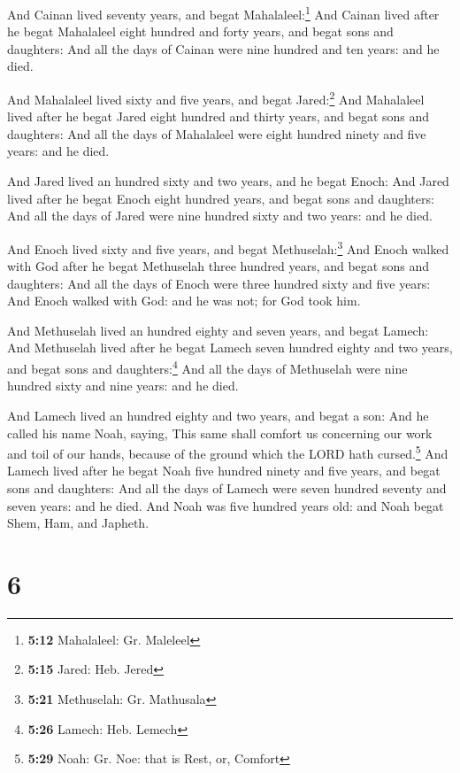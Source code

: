  And Cainan lived seventy years, and begat
Mahalaleel:\footnote{\textbf{5:12} Mahalaleel: Gr. Maleleel}
 And Cainan lived after he begat Mahalaleel eight hundred
and forty years, and begat sons and daughters:  And all
the days of Cainan were nine hundred and ten years: and he died.

 And Mahalaleel lived sixty and five years, and begat
Jared:\footnote{\textbf{5:15} Jared: Heb. Jered}  And
Mahalaleel lived after he begat Jared eight hundred and thirty years,
and begat sons and daughters:  And all the days of
Mahalaleel were eight hundred ninety and five years: and he died.

 And Jared lived an hundred sixty and two years, and he
begat Enoch:  And Jared lived after he begat Enoch eight
hundred years, and begat sons and daughters:  And all the
days of Jared were nine hundred sixty and two years: and he died.

 And Enoch lived sixty and five years, and begat
Methuselah:\footnote{\textbf{5:21} Methuselah: Gr. Mathusala}
 And Enoch walked with God after he begat Methuselah
three hundred years, and begat sons and daughters:  And
all the days of Enoch were three hundred sixty and five years:
 And Enoch walked with God: and he was not; for God took
him.

 And Methuselah lived an hundred eighty and seven years,
and begat Lamech:  And Methuselah lived after he begat
Lamech seven hundred eighty and two years, and begat sons and
daughters:\footnote{\textbf{5:26} Lamech: Heb. Lemech} 
And all the days of Methuselah were nine hundred sixty and nine years:
and he died.

 And Lamech lived an hundred eighty and two years, and
begat a son:  And he called his name Noah, saying, This
same shall comfort us concerning our work and toil of our hands, because
of the ground which the LORD hath cursed.\footnote{\textbf{5:29} Noah:
  Gr. Noe: that is Rest, or, Comfort}  And Lamech lived
after he begat Noah five hundred ninety and five years, and begat sons
and daughters:  And all the days of Lamech were seven
hundred seventy and seven years: and he died.  And Noah
was five hundred years old: and Noah begat Shem, Ham, and Japheth.

\hypertarget{section-5}{%
\section{6}\label{section-5}}

